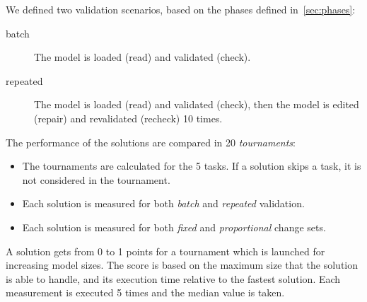 \documentclass[submission,copyright,creativecommons]{eptcs}
\begin{document}
We defined two validation scenarios, based on the phases defined in~\autoref{sec:phases}:

\begin{description}
	\item[batch] The model is loaded (\textsf{read}) and validated (\textsf{check}).
	\item[repeated] The model is loaded (\textsf{read}) and validated (\textsf{check}), then the model is edited (\textsf{repair}) and revalidated (\textsf{recheck}) 10 times.
\end{description}

The performance of the solutions are compared in 20 \emph{tournaments}:

\begin{itemize}
	\item The tournaments are calculated for the 5 tasks. If a solution skips a task, it is not considered in the tournament.
	\item Each solution is measured for both \emph{batch} and \emph{repeated} validation.
	\item Each solution is measured for both \emph{fixed} and \emph{proportional} change sets.
\end{itemize}

A solution gets from 0 to 1 points for a tournament which is launched for increasing model sizes. The score is based on the maximum size that the solution is able to handle, and its execution time relative to the fastest solution. Each measurement is executed 5 times and the median value is taken.
\end{document}

